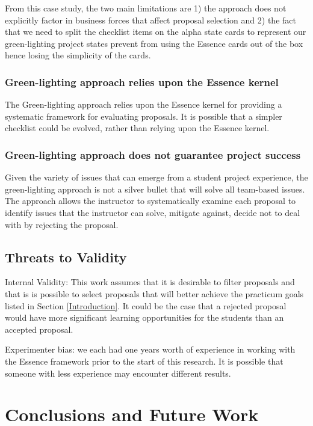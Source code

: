 \documentclass[conference]{IEEEtran}
\begin{document}
From this case study, the two main limitations are 1) the approach does
not explicitly factor in business forces that affect proposal selection
and 2) the fact that we need to split the checklist items on the alpha
state cards to represent our green-lighting project states prevent from
using the Essence cards out of the box hence losing the simplicity of
the cards.

\subsubsection{Green-lighting approach relies upon the Essence kernel}
The Green-lighting approach relies upon the Essence kernel for providing a systematic framework for evaluating proposals. It is possible that a simpler checklist could be evolved, rather than relying upon the Essence kernel.

\subsubsection{Green-lighting approach does not guarantee project success}
Given the variety of issues that can emerge from a student project experience,
the green-lighting approach is not a silver bullet that will solve all team-based issues.
The approach allows the instructor to systematically examine each proposal to identify
issues that the instructor can solve, mitigate against, decide not to deal with by rejecting the proposal.

\subsection{Threats to Validity}
Internal Validity: This work assumes that it is desirable to filter
proposals and that is is possible to select proposals that will better achieve the
practicum goals listed in Section \ref{Introduction}. It could be the case
that a rejected proposal would have more significant learning
opportunities for the students than an accepted proposal. 

Experimenter bias: we each had one years worth of experience in working with
the Essence framework prior to the start of this research. It is
possible that someone with less experience may encounter different results.

\section{Conclusions and Future Work}
\label{Conclusion}
\end{document}
